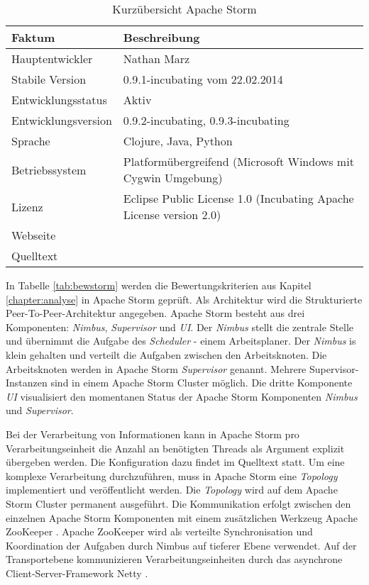 \begin{table}[htbp]
	\centering
		\begin{tabular}{@{}ll@{}} \toprule
			\textbf{Faktum} & \textbf{Beschreibung} \\ \midrule
			Hauptentwickler & Nathan Marz \\
			Stabile Version & 0.9.1-incubating vom 22.02.2014 \\ 
			Entwicklungsstatus &  Aktiv \\
			Entwicklungsversion & 0.9.2-incubating, 0.9.3-incubating \\
			Sprache & Clojure, Java, Python \\
			Betriebssystem & Platformübergreifend (Microsoft Windows mit Cygwin Umgebung) \\
			Lizenz & Eclipse Public License 1.0 (Incubating Apache License version 2.0) \\
			Webseite &  \citeint{storm:home} \\
			Quelltext & \citeint{storm:GitHubApacheMirror} \\			
			\bottomrule			
		\end{tabular}
	\caption{Kurzübersicht Apache Storm}
	\label{tab:vorstorm}
\end{table}

In Tabelle \ref{tab:bewstorm} werden die Bewertungskriterien aus Kapitel \ref{chapter:analyse} in Apache Storm geprüft. Als Architektur wird die Strukturierte Peer-To-Peer-Architektur angegeben. Apache Storm besteht aus drei Komponenten: \textit{Nimbus}, \textit{Supervisor} und \textit{UI}. Der \textit{Nimbus} stellt die zentrale Stelle und übernimmt die Aufgabe des \textit{Scheduler} - einem Arbeitsplaner. Der \textit{Nimbus} is klein gehalten und verteilt die Aufgaben zwischen den Arbeitsknoten. Die Arbeitsknoten werden in Apache Storm \textit{Supervisor} genannt. Mehrere Supervisor-Instanzen sind in einem Apache Storm Cluster möglich. Die dritte Komponente \textit{UI} visualisiert den momentanen Status der Apache Storm Komponenten \textit{Nimbus} und \textit{Supervisor}. 

Bei der Verarbeitung von Informationen kann in Apache Storm pro Verarbeitungseinheit die Anzahl an benötigten Threads als Argument explizit übergeben werden. Die Konfiguration dazu findet im Quelltext statt. Um eine komplexe Verarbeitung durchzuführen, muss in Apache Storm eine \textit{Topology} implementiert und veröffentlicht werden. Die \textit{Topology} wird auf dem Apache Storm Cluster permanent ausgeführt. Die Kommunikation erfolgt zwischen den einzelnen Apache Storm Komponenten mit einem zusätzlichen Werkzeug Apache ZooKeeper . Apache ZooKeeper wird als verteilte Synchronisation und Koordination der Aufgaben durch Nimbus auf tieferer Ebene verwendet. Auf der Transportebene kommunizieren Verarbeitungseinheiten durch das asynchrone Client-Server-Framework Netty .


